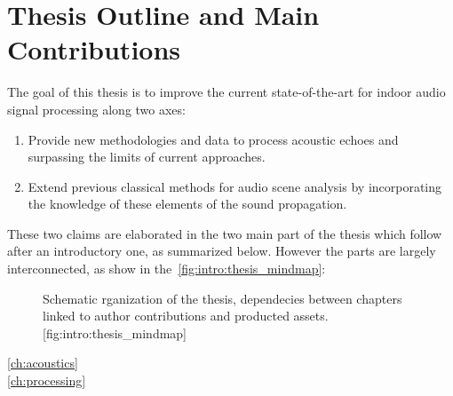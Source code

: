 %



\section{Thesis Outline and Main Contributions}
The goal of this thesis is to improve the current state-of-the-art for indoor audio signal processing along two axes:
\begin{enumerate}
    \item Provide new methodologies and data to process acoustic echoes and surpassing the limits of current approaches.
    \item Extend previous classical methods for audio scene analysis by incorporating the knowledge of these elements of the sound propagation.
\end{enumerate}

\mynewline
These two claims are elaborated in the two main part of the thesis which follow after an introductory one, as summarized below.
However the parts are largely interconnected, as show in the~\cref{fig:intro:thesis_mindmap}:

\begin{figure}[t]
    \begin{sidecaption}{%
        Schematic rganization of the thesis, dependecies between chapters linked to author contributions and producted assets.
    }[fig:intro:thesis_mindmap]
    \centering
    \resizebox{\linewidth}{!}{
        
    }
    \end{sidecaption}
\end{figure}


\begin{description}
    \item[\cref{ch:acoustics}]\synopsisChAcoustics
    \item[\cref{ch:processing}]\synopsisChProcessing
\end{description}

